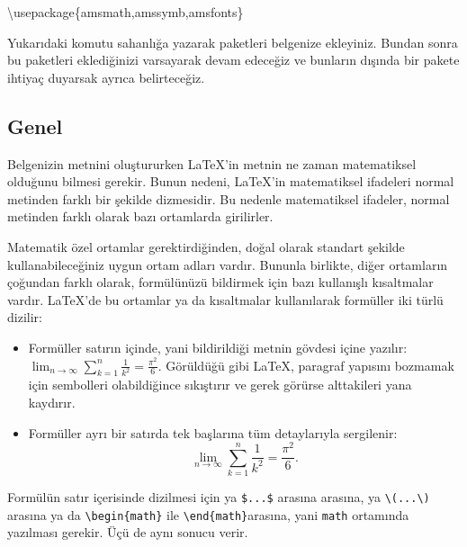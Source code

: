 \documentclass[
  letterpaper,
  DIV=11,
  numbers=noendperiod]{scrreprt}
\newenvironment{Shaded}{\begin{snugshade}}{\end{snugshade}}
\newcommand{\BuiltInTok}[1]{\textcolor[rgb]{0.00,0.23,0.31}{#1}}
\newcommand{\ExtensionTok}[1]{\textcolor[rgb]{0.00,0.23,0.31}{#1}}
\newcommand{\NormalTok}[1]{\textcolor[rgb]{0.00,0.23,0.31}{#1}}
\providecommand{\tightlist}{%
  \setlength{\itemsep}{0pt}\setlength{\parskip}{0pt}}\usepackage{longtable,booktabs,array}
\begin{document}
\begin{Shaded}
\begin{Highlighting}[]
\BuiltInTok{\textbackslash{}usepackage}\NormalTok{\{}\ExtensionTok{amsmath,amssymb,amsfonts}\NormalTok{\}}
\end{Highlighting}
\end{Shaded}

Yukarıdaki komutu sahanlığa yazarak paketleri belgenize ekleyiniz.
Bundan sonra bu paketleri eklediğinizi varsayarak devam edeceğiz ve
bunların dışında bir pakete ihtiyaç duyarsak ayrıca belirteceğiz.

\hypertarget{genel}{%
\subsection{Genel}\label{genel}}

Belgenizin metnini oluştururken {\LaTeX}'in metnin ne zaman matematiksel
olduğunu bilmesi gerekir. Bunun nedeni, {\LaTeX}'in matematiksel
ifadeleri normal metinden farklı bir şekilde dizmesidir. Bu nedenle
matematiksel ifadeler, normal metinden farklı olarak bazı ortamlarda
girilirler.

Matematik özel ortamlar gerektirdiğinden, doğal olarak standart şekilde
kullanabileceğiniz uygun ortam adları vardır. Bununla birlikte, diğer
ortamların çoğundan farklı olarak, formülünüzü bildirmek için bazı
kullanışlı kısaltmalar vardır. {\LaTeX}'de bu ortamlar ya da kısaltmalar
kullanılarak formüller iki türlü dizilir:

\begin{itemize}
\tightlist
\item
  Formüller satırın içinde, yani bildirildiği metnin gövdesi içine
  yazılır:
  \(\lim_{n \to \infty} \sum_{k=1}^n \frac{1}{k^2} =\frac{\pi^2}{6}\).
  Görüldüğü gibi {\LaTeX}, paragraf yapısını bozmamak için sembolleri
  olabildiğince sıkıştırır ve gerek görürse alttakileri yana kaydırır.
\item
  Formüller ayrı bir satırda tek başlarına tüm detaylarıyla sergilenir:
  \[\lim_{n \to \infty} \sum_{k=1}^n
  \frac{1}{k^2} =\frac{\pi^2}{6}.\]
\end{itemize}

Formülün satır içerisinde dizilmesi için ya \texttt{\$...\$} arasına
arasına, ya \texttt{\textbackslash{}(...\textbackslash{})} arasına ya da
\texttt{\textbackslash{}begin\{math\}} ile
\texttt{\textbackslash{}end\{math\}}arasına, yani \texttt{math}
ortamında yazılması gerekir. Üçü de aynı sonucu verir.
\end{document}
